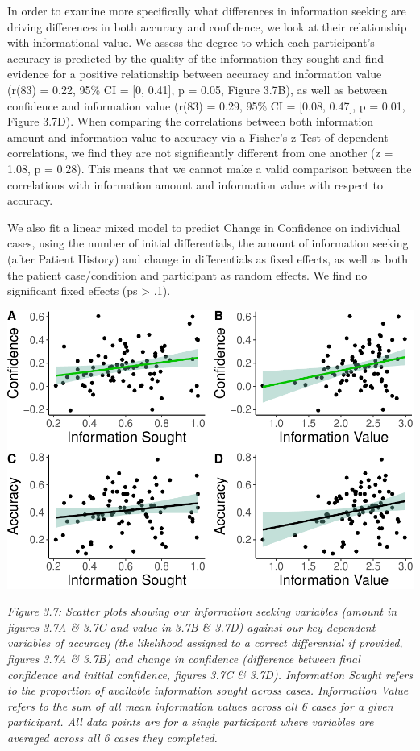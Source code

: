 \documentclass[a4paper, nobind]{templates/ociamthesis}
\begin{document}
\hfill\break
In order to examine more specifically what differences in information seeking are driving differences in both accuracy and confidence, we look at their relationship with informational value. We assess the degree to which each participant's accuracy is predicted by the quality of the information they sought and find evidence for a positive relationship between accuracy and information value (r(83) = 0.22, 95\% CI = {[}0, 0.41{]}, p = 0.05, Figure 3.7B), as well as between confidence and information value (r(83) = 0.29, 95\% CI = {[}0.08, 0.47{]}, p = 0.01, Figure 3.7D). When comparing the correlations between both information amount and information value to accuracy via a Fisher's z-Test of dependent correlations, we find they are not significantly different from one another (z = 1.08, p = 0.28). This means that we cannot make a valid comparison between the correlations with information amount and information value with respect to accuracy.

\hfill\break
We also fit a linear mixed model to predict Change in Confidence on individual cases, using the number of initial differentials, the amount of information seeking (after Patient History) and change in differentials as fixed effects, as well as both the patient case/condition and participant as random effects. We find no significant fixed effects (ps \textgreater{} .1).

\newpage

\begin{center}\includegraphics[width=1\linewidth]{_main_files/figure-latex/confAccPlot-1} \end{center}

\emph{Figure 3.7: Scatter plots showing our information seeking variables (amount in figures 3.7A \& 3.7C and value in 3.7B \& 3.7D) against our key dependent variables of accuracy (the likelihood assigned to a correct differential if provided, figures 3.7A \& 3.7B) and change in confidence (difference between final confidence and initial confidence, figures 3.7C \& 3.7D). Information Sought refers to the proportion of available information sought across cases. Information Value refers to the sum of all mean information values across all 6 cases for a given participant. All data points are for a single participant where variables are averaged across all 6 cases they completed.}\\
\end{document}

